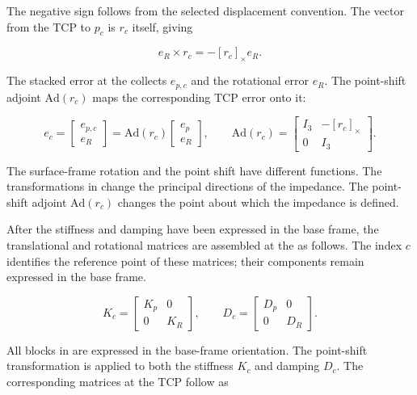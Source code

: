 The negative sign follows from the selected displacement convention. The vector from
the TCP to \mbox{\(p_c\)} is \mbox{\(r_c\)} itself, giving

\[
e_R\times r_c
=
-[r_c]_\times e_R.
\]

The stacked error at the  collects \mbox{\(e_{p,c}\)} and the
rotational error \mbox{\(e_R\)}. The point-shift adjoint
\mbox{\(\mathrm{Ad}(r_c)\)} maps the corresponding TCP error onto it:

\begin{equation}
e_c
=
\begin{bmatrix}
e_{p,c}\\[2pt]
e_R
\end{bmatrix}
=
\mathrm{Ad}(r_c)
\begin{bmatrix}
e_p\\[2pt]
e_R
\end{bmatrix},
\qquad
\mathrm{Ad}(r_c)
=
\begin{bmatrix}
I_3 & -[r_c]_\times\\[2pt]
0 & I_3
\end{bmatrix}.
\label{eq:offset_adjoint}
\end{equation}

The surface-frame rotation and the point shift have different functions.
The transformations in
\mbox{}
change the principal directions of the impedance. The point-shift adjoint
\mbox{\(\mathrm{Ad}(r_c)\)} changes the point about which the impedance is
defined.

After the stiffness and damping have been expressed in the base frame, the
translational and rotational matrices are assembled at the  as
follows. The index \mbox{\(c\)} identifies the reference point of these
matrices; their components remain expressed in the base frame.

\begin{equation}
K_c
=
\begin{bmatrix}
K_p & 0\\
0 & K_R
\end{bmatrix},
\qquad
D_c
=
\begin{bmatrix}
D_p & 0\\
0 & D_R
\end{bmatrix}.
\label{eq:pole_block_gains}
\end{equation}

All blocks in \mbox{} are expressed in the base-frame
orientation. The point-shift transformation is applied to both the stiffness
\mbox{\(K_c\)} and damping \mbox{\(D_c\)}. The corresponding matrices at the
TCP follow as

